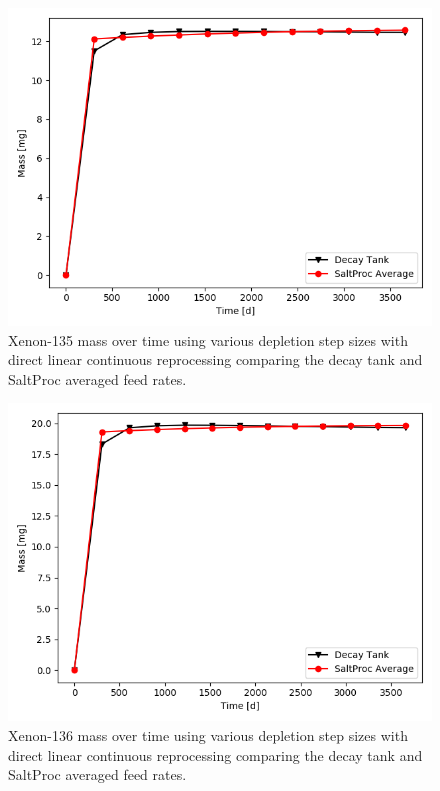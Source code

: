 \begin{figure}[H]
  \centering
  \includegraphics[scale=0.7]{images/adv-Xe135.png}
  \caption{Xenon-135 mass over time using various depletion step sizes with direct linear continuous reprocessing comparing the decay tank and SaltProc averaged feed rates.}
   \label{fig:DL-cont-xe135-adv}
\end{figure}

\begin{figure}[H]
  \centering
  \includegraphics[scale=0.7]{images/adv-Xe136.png}
  \caption{Xenon-136 mass over time using various depletion step sizes with direct linear continuous reprocessing comparing the decay tank and SaltProc averaged feed rates.}
   \label{fig:DL-cont-xe136-adv}
\end{figure}

